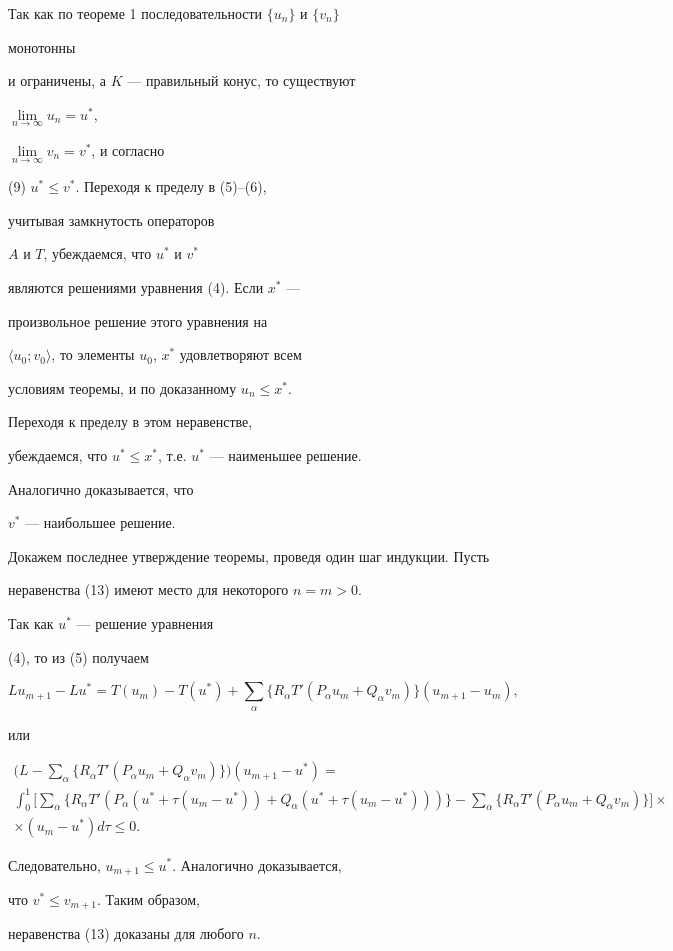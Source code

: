 \begin{pf} Так как по теореме 1 последовательности $\{u_n\}$ и $\{v_n\}$


монотонны


и ограничены, а $K$ --- правильный конус, то существуют


$\lim\limits_{n\to\infty}u_n=u^*$,


$\lim\limits_{n\to\infty}v_n=v^*$, и согласно


(9) $u^*\le v^*$. Переходя к пределу в (5)--(6),


учитывая замкнутость операторов


$A$ и $T$, убеждаемся, что $u^*$ и $v^*$


являются решениями уравнения (4). Если $x^*$ ---


произвольное решение этого уравнения на


$\langle u_0;v_0\rangle$, то элементы $u_0$, $x^*$ удовлетворяют всем


условиям теоремы, и по доказанному $u_n\le x^*$.


Переходя к пределу в этом неравенстве,


убеждаемся, что $u^*\le x^*$, т.е. $u^*$ --- наименьшее решение.


Аналогично доказывается, что


$v^*$ --- наибольшее решение.





Докажем последнее утверждение теоремы, проведя один шаг индукции. Пусть


неравенства (13) имеют место для некоторого $n=m>0$.


Так как $u^*$ --- решение уравнения


(4), то из (5) получаем


$$


Lu_{m+1}-Lu^*=T(u_m)-T(u^*)+\sum_\alpha\{R_\alpha T'


(P_\alpha u_m+Q_\alpha v_m)\}(u_{m+1}-u_m),


$$


или


\begin{gather*}


\biggl(L-\sum_\alpha\{R_\alpha T'(P_\alpha u_m+Q_\alpha v_m)\}\biggr)


(u_{m+1}-u^*)= \\


\int^1_0\biggl[\sum_\alpha\{R_\alpha T'(P_\alpha(u^*+\tau(u_m-u^*))+


Q_\alpha(u^*+\tau(u_m-u^*)))\}-


\sum_\alpha\{R_\alpha T'(P_\alpha u_m+Q_\alpha v_m)\}\biggr]\times \\


\times (u_m-u^*)d\tau\le 0.


\end{gather*}


Следовательно, $u_{m+1}\le u^*$. Аналогично доказывается,


что $v^*\le v_{m+1}$. Таким образом,


неравенства (13) доказаны для любого $n$.


\end{pf}
